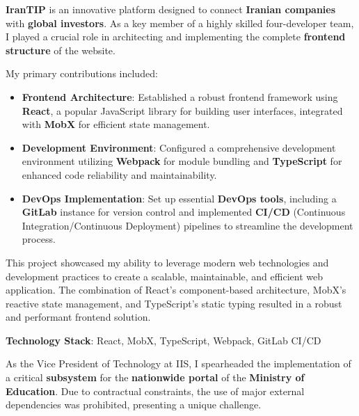 \textbf{IranTIP} is an innovative platform designed to connect \textbf{Iranian companies} with \textbf{global investors}. As a key member of a highly skilled four-developer team, I played a crucial role in architecting and implementing the complete \textbf{frontend structure} of the website.

My primary contributions included:

\begin{itemize}
    \item \textbf{Frontend Architecture}: Established a robust frontend framework using \textbf{React}, a popular JavaScript library for building user interfaces, integrated with \textbf{MobX} for efficient state management.
    
    \item \textbf{Development Environment}: Configured a comprehensive development environment utilizing \textbf{Webpack} for module bundling and \textbf{TypeScript} for enhanced code reliability and maintainability.
    
    \item \textbf{DevOps Implementation}: Set up essential \textbf{DevOps tools}, including a \textbf{GitLab} instance for version control and implemented \textbf{CI/CD} (Continuous Integration/Continuous Deployment) pipelines to streamline the development process.
\end{itemize}

This project showcased my ability to leverage modern web technologies and development practices to create a scalable, maintainable, and efficient web application. The combination of React's component-based architecture, MobX's reactive state management, and TypeScript's static typing resulted in a robust and performant frontend solution.

\smallskip
\textbf{Technology Stack}:
React, MobX, TypeScript, Webpack, GitLab CI/CD

\vfill
\divider
\vfill

As the Vice President of Technology at IIS, I spearheaded the implementation of a critical \textbf{subsystem} for the \textbf{nationwide portal} of the \textbf{Ministry of Education}. Due to contractual constraints, the use of major external dependencies was prohibited, presenting a unique challenge.

